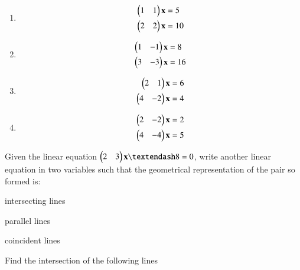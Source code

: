 \begin{enumerate}[itemsep=2pt]
\item
\begin{align}
\begin{split}
\begin{pmatrix}1 & 1 \end{pmatrix}\mathbf{x}&=5
\\
\begin{pmatrix}2 & 2 \end{pmatrix}\mathbf{x}&=10
\end{split}
\label{linform/2/8/1.0.1}
\end{align}
\item
\begin{align}
\begin{split}
\begin{pmatrix}1 & -1 \end{pmatrix}\mathbf{x}&=8
\\
\begin{pmatrix}3 & -3 \end{pmatrix}\mathbf{x}&=16
\end{split}
\label{linform/2/8/1.0.2}
\end{align}
\item
\begin{align}
\begin{split}
\begin{pmatrix}2 & 1 \end{pmatrix}\mathbf{x}&=6
\\
\begin{pmatrix}4 & -2 \end{pmatrix}\mathbf{x}&=4
\end{split}
\label{linform/2/8/2/1.0.1}
\end{align}
\item
\begin{align}
\begin{split}
\begin{pmatrix}2 & -2 \end{pmatrix}\mathbf{x}&=2
\\
\begin{pmatrix}4 & -4 \end{pmatrix}\mathbf{x}&=5
\end{split}
\label{linform/2/8/2/1.0.2}
\end{align}
\end{enumerate}
%
\solution


\item Given the linear equation $\myvec{2 & 3}\vec{x} – 8 = 0$, write another linear equation in two variables such that the geometrical representation of the pair so formed is: 
%
\begin{enumerate}[itemsep=2pt]
\begin{multicols}{2}
\item  intersecting lines
\item parallel lines 
\item  coincident lines
\end{multicols}
\end{enumerate}
%
\solution

%
\item Find the intersection of the following lines

